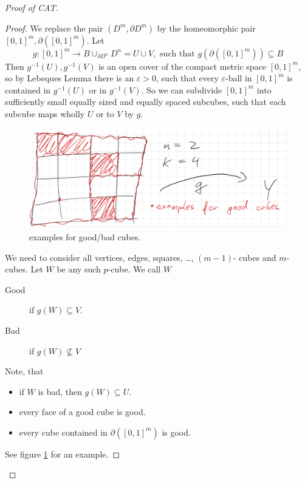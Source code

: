 \documentclass{TemplateLecture}
\begin{document}
\begin{proof}[Proof of CAT]
\begin{proof}
        We replace the pair \((D^m, \partial D^m)\) by the homeomorphic pair \([0,1]^m, \partial([0,1]^m)\). Let
        \[g\colon [0,1]^m \to B\cup_{\partial D^n}D^n = U \cup V, \text{ such that }g(\partial([0,1]^m)) \subseteq B\]
        Then \(g^{-1}(U), g^{-1}(V)\) is an open cover of the compact metric space \([0,1]^m\), so by Lebeques Lemma there is an \(\varepsilon > 0\), such that every \(\varepsilon\)-ball in \([0,1]^m\) is contained in \(g^{-1}(U)\) or in \(g^{-1}(V)\). So we can subdivide \([0,1]^m\) into sufficiently small equally sized and equally spaced subcubes, such that each subcube maps wholly \(U\) or to \(V\) by \(g\).
        \begin{figure}
            \centering
            \includegraphics[width=0.8\linewidth]{pic/excb.png}
            \caption{examples for good/bad cubes.}
            \label{fig:excb}
        \end{figure}
        We need to consider all vertices, edges, squares, \dots, \((m-1)\)- cubes and \(m\)-cubes. Let \(W\) be any such \(p\)-cube. We call \(W\)
        \begin{description}
            \item[Good] if \(g(W) \subseteq V\).
            \item[Bad] if \(g(W) \not\subseteq V\)
        \end{description}
        Note, that
        \begin{itemize}
            \item if \(W\) is bad, then \(g(W) \subseteq U\).
            \item every face of a good cube is good.
            \item every cube contained in \(\partial([0,1]^m)\) is good.
        \end{itemize}
        See figure \ref{fig:excb} for an example.


\end{proof}
\end{proof}
\end{document}
